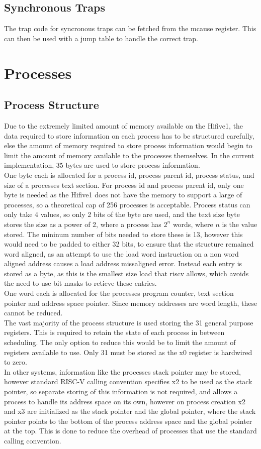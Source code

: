 \subsection{Synchronous Traps}
The trap code for syncronous traps can be fetched from the mcause register. This can then be used with a jump table to handle the correct trap.
\section{Processes}
\subsection{Process Structure}
Due to the extremely limited amount of memory available on the Hifive1, the data required to store information on each process has to be structured carefully, else the amount of memory required to store process information would begin to limit the amount of memory available to the processes themselves. In the current implementation, 35 bytes are used to store process information.
\\
One byte each is allocated for a process id, process parent id, process status, and size of a processes text section. For process id and process parent id, only one byte is needed as the Hifive1 does not have the memory to support a large of processes, so a theoretical cap of 256 processes is acceptable. Process status can only take 4 values, so only 2 bits of the byte are used, and the text size byte stores the size as a power of 2, where a process has \(2^n\) words, where \(n\) is the value stored. The mininum number of bits needed to store these is 13, however this would need to be padded to either 32 bits, to ensure that the structure remained word aligned, as an attempt to use the load word instruction on a non word aligned address causes a load address missaligned error. Instead each entry is stored as a byte, as this is the smallest size load that \gls{riscv} allows, which avoids the need to use bit masks to retieve these entries.
\\
One word each is allocated for the processes program counter, text section pointer and address space pointer. Since memory addresses are word length, these cannot be reduced.
\\
The vast majority of the process structure is used storing the 31 general purpose registers. This is required to retain the state of each process in between scheduling. The only option to reduce this would be to limit the amount of registers available to use. Only 31 must be stored as the x0 register is hardwired to zero.
\\
In other systems, information like the processes stack pointer may be stored, however standard RISC-V calling convention specifies x2 to be used as the stack pointer, so separate storing of this information is not required, and allows a process to handle its address space on its own, however on process creation x2 and x3 are initialized as the stack pointer and the global pointer, where the stack pointer points to the bottom of the process address space and the global pointer at the top. This is done to reduce the overhead of processes that use the standard calling convention.
